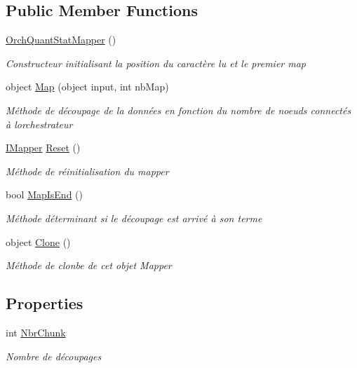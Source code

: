 \subsection*{Public Member Functions}
\begin{DoxyCompactItemize}
\item 
\hyperlink{class_a_d_net_1_1_map___reduce_1_1_orch_1_1_orch_quant_stat_mapper_a04b62a4176ee7353998f34d262ef9f74}{Orch\+Quant\+Stat\+Mapper} ()
\begin{DoxyCompactList}\small\item\em Constructeur initialisant la position du caractère lu et le premier map \end{DoxyCompactList}\item 
object \hyperlink{class_a_d_net_1_1_map___reduce_1_1_orch_1_1_orch_quant_stat_mapper_a0e13cf0b99158b111ccb3d712435d4f1}{Map} (object input, int nb\+Map)
\begin{DoxyCompactList}\small\item\em Méthode de découpage de la données en fonction du nombre de noeuds connectés à l\textquotesingle{}orchestrateur \end{DoxyCompactList}\item 
\hyperlink{interface_node_net_1_1_map___reduce_1_1_i_mapper}{I\+Mapper} \hyperlink{class_a_d_net_1_1_map___reduce_1_1_orch_1_1_orch_quant_stat_mapper_a374ab1b409195fbaeb104755028f2876}{Reset} ()
\begin{DoxyCompactList}\small\item\em Méthode de réinitialisation du mapper \end{DoxyCompactList}\item 
bool \hyperlink{class_a_d_net_1_1_map___reduce_1_1_orch_1_1_orch_quant_stat_mapper_a89d51140c9afd79b450619a41974d0b0}{Map\+Is\+End} ()
\begin{DoxyCompactList}\small\item\em Méthode déterminant si le découpage est arrivé à son terme \end{DoxyCompactList}\item 
object \hyperlink{class_a_d_net_1_1_map___reduce_1_1_orch_1_1_orch_quant_stat_mapper_ab19865558d09a6f567ccb318c5ed14d5}{Clone} ()
\begin{DoxyCompactList}\small\item\em Méthode de clonbe de cet objet Mapper \end{DoxyCompactList}\end{DoxyCompactItemize}
\subsection*{Properties}
\begin{DoxyCompactItemize}
\item 
int \hyperlink{class_a_d_net_1_1_map___reduce_1_1_orch_1_1_orch_quant_stat_mapper_a90f65cbeb40969deb868a363051dc280}{Nbr\+Chunk}
\begin{DoxyCompactList}\small\item\em Nombre de découpages \end{DoxyCompactList}\end{DoxyCompactItemize}


